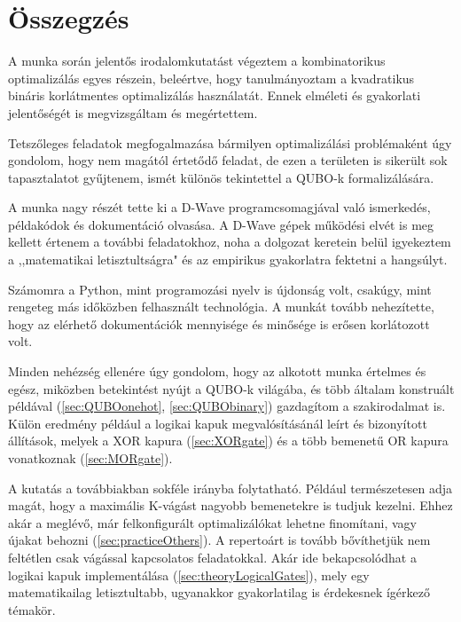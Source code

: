 
\chapter{Összegzés}

A munka során jelentős irodalomkutatást végeztem a kombinatorikus optimalizálás egyes részein, beleértve, hogy tanulmányoztam a kvadratikus bináris korlátmentes optimalizálás használatát. Ennek elméleti és gyakorlati jelentőségét is megvizsgáltam és megértettem.

Tetszőleges feladatok megfogalmazása bármilyen optimalizálási problémaként úgy gondolom, hogy nem magától értetődő feladat, de ezen a területen is sikerült sok tapasztalatot gyűjtenem, ismét különös tekintettel a QUBO-k formalizálására.

A munka nagy részét tette ki a D-Wave programcsomagjával való ismerkedés, példakódok és dokumentáció olvasása. A D-Wave gépek működési elvét is meg kellett értenem a további feladatokhoz, noha a dolgozat keretein belül igyekeztem a ,,matematikai letisztultságra" és az empirikus gyakorlatra fektetni a hangsúlyt.

Számomra a Python, mint programozási nyelv is újdonság volt, csakúgy, mint rengeteg más időközben felhasznált technológia. A munkát tovább nehezítette, hogy az elérhető dokumentációk mennyisége és minősége is erősen korlátozott volt.

Minden nehézség ellenére úgy gondolom, hogy az alkotott munka értelmes és egész, miközben betekintést nyújt a QUBO-k világába, és több általam konstruált példával (\ref{sec:QUBOonehot}, \ref{sec:QUBObinary}) gazdagítom a szakirodalmat is. Külön eredmény például a logikai kapuk megvalósításánál leírt és bizonyított állítások, melyek a XOR kapura (\ref{sec:XORgate}) és a több bemenetű OR kapura vonatkoznak (\ref{sec:MORgate}).

A kutatás a továbbiakban sokféle irányba folytatható. Például természetesen adja magát, hogy a maximális K-vágást nagyobb bemenetekre is tudjuk kezelni. Ehhez akár a meglévő, már felkonfigurált optimalizálókat lehetne finomítani, vagy újakat behozni (\ref{sec:practiceOthers}). A repertoárt is tovább bővíthetjük nem feltétlen csak vágással kapcsolatos feladatokkal. Akár ide bekapcsolódhat a logikai kapuk implementálása (\ref{sec:theoryLogicalGates}), mely egy matematikailag letisztultabb, ugyanakkor gyakorlatilag is érdekesnek ígérkező témakör.

